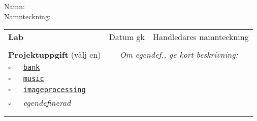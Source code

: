 \vspace{2.5em}\noindent Namn: \dotfill\\

\vspace{1em}\noindent Namnteckning: \dotfill\\

\newcommand{\LabRow}[1]{\\[-1.1em] \hyperref[section:lab:#1]{\texttt{#1}} & \dotfill &  \dotfill  \\ \addlinespace }

\begin{table}[h]
\centering
\vspace{1em}
\begin{tabular}{lcc}
\toprule \addlinespace
{\sffamily\bfseries\small Lab} & {\sffamily\small Datum gk} &	{\sffamily\small Handledares namnteckning}\\ \addlinespace \midrule \\[-0.5em]

\addlinespace \midrule \addlinespace
{\sffamily\small {\bfseries Projektuppgift} (välj en)	} &
\multicolumn{2}{c}{\textit{Om egendef., ge kort beskrivning:}}  \\
\addlinespace\addlinespace %
{\Large$\square$}\texttt{~~~\hyperref[section:proj:bank]{bank}}  &  &  \\ \addlinespace
{\Large$\square$}\texttt{~~~\hyperref[section:proj:music]{music}} \\ \addlinespace
{\Large$\square$}\texttt{~~~\hyperref[section:proj:imageprocessing]{imageprocessing}}  \\ \addlinespace
{\Large$\square$}\texttt{~~~}\textit{egendefinerad}  \\
\\
\\
\bottomrule
\end{tabular}
\end{table}

